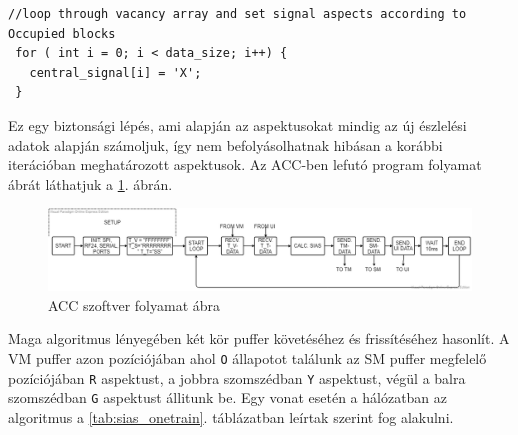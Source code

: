 \documentclass[a4paper,12pt]{article}
\begin{document}
\begin{minipage}{\linewidth}
\begin{lstlisting}[style=CStyle, caption={Alap állapotok beállítása az ACC-ben},label=code:acc_sig_def]
 //loop through vacancy array and set signal aspects according to Occupied blocks
 for ( int i = 0; i < data_size; i++) {
   central_signal[i] = 'X';
 }
\end{lstlisting}
\end{minipage}

Ez egy biztonsági lépés, ami alapján az aspektusokat mindig az új észlelési adatok alapján számoljuk, így nem befolyásolhatnak hibásan a korábbi iterációban meghatározott aspektusok.
Az ACC-ben lefutó program folyamat ábrát láthatjuk a \ref{fig:ACCflowchart}. ábrán.

\begin{figure}[!htp]
	\includegraphics[width=\linewidth]{images/ACC_module_flow_chart.png}
    \caption[ACC folyamat ábra]{ACC szoftver folyamat ábra}
	\label{fig:ACCflowchart}
\end{figure}


Maga algoritmus lényegében két kör puffer követéséhez és frissítéséhez hasonlít. 
A VM puffer azon pozíciójában ahol \texttt{O} állapotot találunk az SM puffer megfelelő pozíciójában \texttt{R} aspektust, a jobbra szomszédban \texttt{Y} aspektust, végül a balra szomszédban \texttt{G} aspektust állitunk be.
Egy vonat esetén a hálózatban az algoritmus a \ref{tab:sias_onetrain}. táblázatban leírtak szerint fog alakulni.
\end{document}
